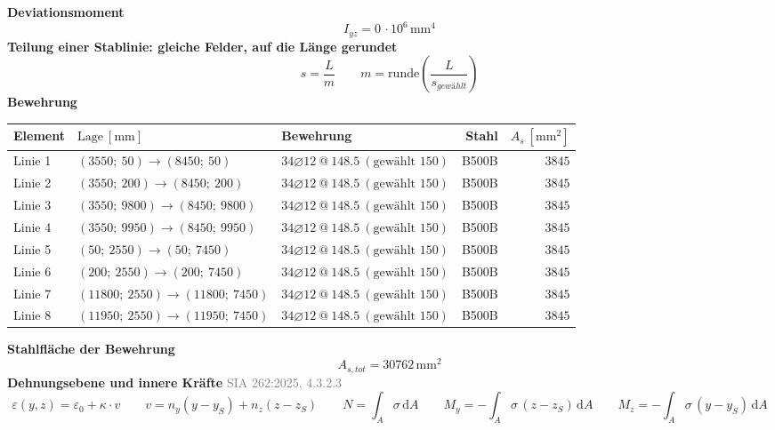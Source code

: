 \documentclass[11pt,a4paper]{article}
\newcommand{\normref}[1]{{\small\textcolor{gray}{#1}}}
\begin{document}
\noindent\textbf{Deviationsmoment}
\begin{equation*}
I_{yz} = 0\,\cdot 10^{6}\,\mathrm{mm}^{4}
\end{equation*}
\noindent\textbf{Teilung einer Stablinie: gleiche Felder, auf die Länge gerundet}
\begin{equation*}
s = \frac{L}{m} \qquad m = \mathrm{runde}\left(\frac{L}{s_{gewählt}}\right)
\end{equation*}
\noindent\textbf{Bewehrung}
\begin{longtable}{lllrr}
\hline
Element & $\text{Lage}\ [\mathrm{mm}]$ & Bewehrung & Stahl & $A_s\ [\mathrm{mm}^2]$ \\
\hline
\endhead
Linie 1 & $(3550;\ 50) \rightarrow (8450;\ 50)$ & $34 \varnothing 12\ @\ 148.5\ (\text{gewählt } 150)$ & B500B & $3845$ \\
Linie 2 & $(3550;\ 200) \rightarrow (8450;\ 200)$ & $34 \varnothing 12\ @\ 148.5\ (\text{gewählt } 150)$ & B500B & $3845$ \\
Linie 3 & $(3550;\ 9800) \rightarrow (8450;\ 9800)$ & $34 \varnothing 12\ @\ 148.5\ (\text{gewählt } 150)$ & B500B & $3845$ \\
Linie 4 & $(3550;\ 9950) \rightarrow (8450;\ 9950)$ & $34 \varnothing 12\ @\ 148.5\ (\text{gewählt } 150)$ & B500B & $3845$ \\
Linie 5 & $(50;\ 2550) \rightarrow (50;\ 7450)$ & $34 \varnothing 12\ @\ 148.5\ (\text{gewählt } 150)$ & B500B & $3845$ \\
Linie 6 & $(200;\ 2550) \rightarrow (200;\ 7450)$ & $34 \varnothing 12\ @\ 148.5\ (\text{gewählt } 150)$ & B500B & $3845$ \\
Linie 7 & $(11800;\ 2550) \rightarrow (11800;\ 7450)$ & $34 \varnothing 12\ @\ 148.5\ (\text{gewählt } 150)$ & B500B & $3845$ \\
Linie 8 & $(11950;\ 2550) \rightarrow (11950;\ 7450)$ & $34 \varnothing 12\ @\ 148.5\ (\text{gewählt } 150)$ & B500B & $3845$ \\
\hline
\end{longtable}
\noindent\textbf{Stahlfläche der Bewehrung}
\begin{equation*}
A_{s,tot} = 30762\,\mathrm{mm}^{2}
\end{equation*}
\noindent\textbf{Dehnungsebene und innere Kräfte} \hfill \normref{SIA 262:2025, 4.3.2.3}
\begin{equation*}
\varepsilon(y, z) = \varepsilon_0 + \kappa \cdot v \qquad v = n_y (y - y_S) + n_z (z - z_S) \qquad N = \int_A \sigma\,\mathrm{d}A \qquad M_y = -\int_A \sigma\,(z - z_S)\,\mathrm{d}A \qquad M_z = -\int_A \sigma\,(y - y_S)\,\mathrm{d}A
\end{equation*}
\end{document}
